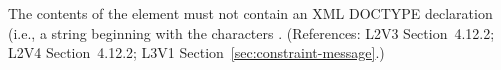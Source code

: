 The contents of the  element must not contain an XML
DOCTYPE declaration (i.e., a string beginning with the characters
.  (References: L2V3 Section~4.12.2; L2V4 Section~4.12.2; 
L3V1 Section~\ref{sec:constraint-message}.)
